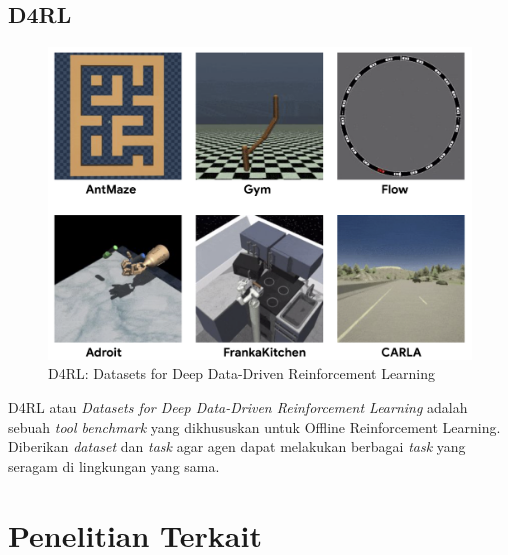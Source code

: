 \subsection{D4RL}
\begin{figure}[H] 
	\centering
	\includegraphics[width=.4\linewidth]{images/d4rl}
	\caption{D4RL: Datasets for Deep Data-Driven Reinforcement Learning \cite{cit:d4rl}}
	\label{fig:d4rl}
\end{figure}
D4RL atau \textit{Datasets for Deep Data-Driven Reinforcement Learning }adalah sebuah \textit{tool benchmark }yang dikhususkan untuk Offline Reinforcement Learning. Diberikan \textit{dataset }dan \textit{task }agar agen dapat melakukan berbagai \textit{task }yang seragam di lingkungan yang sama. \cite{cit:d4rl}
\fi

\section{Penelitian Terkait}
\label{sec:penelitian_terkait}

